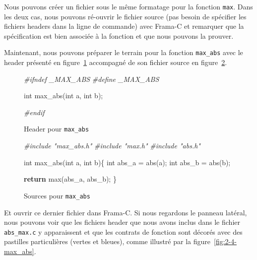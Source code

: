 \documentclass[12pt,francais,]{scrbook}
\newenvironment{Shaded}{}{}
\newcommand{\KeywordTok}[1]{\textcolor[rgb]{0.00,0.44,0.13}{\textbf{{#1}}}}
\newcommand{\DataTypeTok}[1]{\textcolor[rgb]{0.56,0.13,0.00}{{#1}}}
\newcommand{\CommentTok}[1]{\textcolor[rgb]{0.38,0.63,0.69}{\textit{{#1}}}}
\newcommand{\NormalTok}[1]{{#1}}
\begin{document}
Nous pouvons créer un fichier sous le même formatage pour la fonction
\texttt{max}. Dans les deux cas, nous pouvons ré-ouvrir le fichier
source (pas besoin de spécifier les fichiers headers dans la ligne de
commande) avec Frama-C et remarquer que la spécification est bien
associée à la fonction et que nous pouvons la prouver.

Maintenant, nous pouvons préparer le terrain pour la fonction
\texttt{max\_abs} avec le header présenté en figure~\ref{fig:3-4-hd2}
accompagné de son fichier source en figure~\ref{fig:3-4-src2}.

\begin{figure}
  \centering
\begin{footnotesize}\begin{Shaded}
\begin{Highlighting}[]
\CommentTok{#ifndef _MAX_ABS}
\CommentTok{#define _MAX_ABS}

\DataTypeTok{int} \NormalTok{max_abs(}\DataTypeTok{int} \NormalTok{a, }\DataTypeTok{int} \NormalTok{b);}

\CommentTok{#endif}
\end{Highlighting}
\end{Shaded}\end{footnotesize}
\caption{Header pour \texttt{max\_abs}}
\label{fig:3-4-hd2}
\end{figure}

\begin{figure}
  \centering
\begin{footnotesize}\begin{Shaded}
\begin{Highlighting}[]
\CommentTok{#include "max_abs.h"}
\CommentTok{#include "max.h"}
\CommentTok{#include "abs.h"}

\DataTypeTok{int} \NormalTok{max_abs(}\DataTypeTok{int} \NormalTok{a, }\DataTypeTok{int} \NormalTok{b)\{}
  \DataTypeTok{int} \NormalTok{abs_a = abs(a);}
  \DataTypeTok{int} \NormalTok{abs_b = abs(b);}

  \KeywordTok{return} \NormalTok{max(abs_a, abs_b);}
\NormalTok{\}}
\end{Highlighting}
\end{Shaded}\end{footnotesize}
\caption{Sources pour \texttt{max\_abs}}
\label{fig:3-4-src2}
\end{figure}

Et ouvrir ce dernier fichier dans Frama-C. Si nous regardons le panneau
latéral, nous pouvons voir que les fichiers header que nous avons inclus
dans le fichier \texttt{abs\_max.c} y apparaissent et que les contrats
de fonction sont décorés avec des pastilles particulières (vertes et
bleues), comme illustré par la figure~\ref{fig:2-4-max_abs}.
\end{document}
